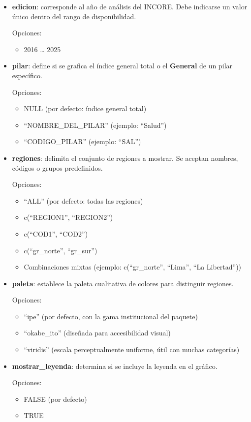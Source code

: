 \documentclass[
  11pt,
  letterpaper,
  DIV=11,
  numbers=noendperiod]{scrartcl}
\providecommand{\tightlist}{%
  \setlength{\itemsep}{0pt}\setlength{\parskip}{0pt}}\usepackage{longtable,booktabs,array}
\begin{document}
\begin{itemize}
\item
  \textbf{edicion}: corresponde al año de análisis del INCORE. Debe
  indicarse un valor único dentro del rango de disponibilidad.

  Opciones:

  \begin{itemize}
  \tightlist
  \item
    2016 \ldots{} 2025
  \end{itemize}
\item
  \textbf{pilar}: define si se grafica el índice general total o el
  \textbf{General} de un pilar específico.

  Opciones:

  \begin{itemize}
  \item
    NULL (por defecto: índice general total)
  \item
    ``NOMBRE\_DEL\_PILAR'' (ejemplo: ``Salud'')
  \item
    ``CODIGO\_PILAR'' (ejemplo: ``SAL'')
  \end{itemize}
\item
  \textbf{regiones}: delimita el conjunto de regiones a mostrar. Se
  aceptan nombres, códigos o grupos predefinidos.

  Opciones:

  \begin{itemize}
  \item
    ``ALL'' (por defecto: todas las regiones)
  \item
    c(``REGION1'', ``REGION2'')
  \item
    c(``COD1'', ``COD2'')
  \item
    c(``gr\_norte'', ``gr\_sur'')
  \item
    Combinaciones mixtas (ejemplo: c(``gr\_norte'', ``Lima'', ``La
    Libertad''))
  \end{itemize}
\item
  \textbf{paleta}: establece la paleta cualitativa de colores para
  distinguir regiones.

  Opciones:

  \begin{itemize}
  \item
    ``ipe'' (por defecto, con la gama institucional del paquete)
  \item
    ``okabe\_ito'' (diseñada para accesibilidad visual)
  \item
    ``viridis'' (escala perceptualmente uniforme, útil con muchas
    categorías)
  \end{itemize}
\item
  \textbf{mostrar\_leyenda}: determina si se incluye la leyenda en el
  gráfico.

  Opciones:

  \begin{itemize}
  \item
    FALSE (por defecto)
  \item
    TRUE
  \end{itemize}
\end{itemize}
\end{document}
